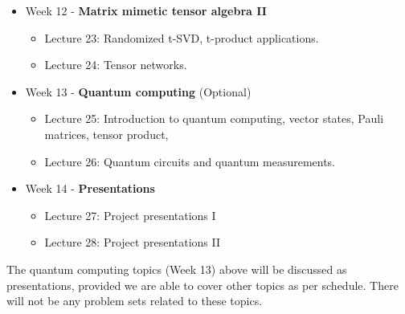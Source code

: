 \documentclass[a4paper,11pt]{article}
\begin{document}
\begin{itemize}
\item Week 12  - {\bf Matrix mimetic tensor algebra II}
\begin{itemize}
\item Lecture 23: Randomized t-SVD, t-product applications.
\item Lecture 24: Tensor networks.
\end{itemize}

\item Week 13  - {\bf Quantum computing} (Optional)
\begin{itemize}
\item Lecture 25: Introduction to quantum computing, vector states, Pauli matrices, tensor product,
\item Lecture 26:   Quantum  circuits and quantum measurements.
\end{itemize}

\item Week 14  - {\bf Presentations}
\begin{itemize}
\item Lecture 27: Project presentations I
\item Lecture 28: Project presentations II
\end{itemize}


\end{itemize}

The quantum computing topics (Week 13) above will be discussed as presentations, provided we are able to cover other topics as per schedule. There will not be any problem sets related to these topics.
\end{document}
